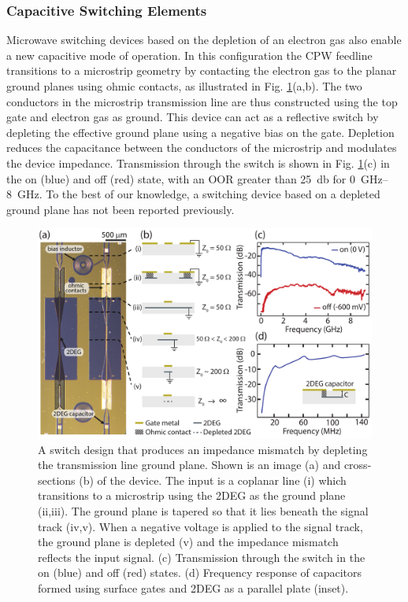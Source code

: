 \subsubsection{Capacitive Switching Elements}
Microwave switching devices based on the depletion of an electron gas also enable a new capacitive mode of operation. In this configuration the CPW feedline transitions to a microstrip geometry by contacting the electron gas to the planar ground planes using ohmic contacts, as illustrated in Fig. \ref{fig:CAPswitch}(a,b). The two conductors in the microstrip transmission line are thus constructed using the top gate and electron gas as ground. This device can act as a reflective switch by depleting the effective ground plane using a negative bias on the gate. Depletion reduces the capacitance between the conductors of the microstrip and modulates the device impedance.
Transmission through the switch is shown in Fig. \ref{fig:CAPswitch}(c) in the on (blue) and off (red) state, with an OOR greater than \SI{25}{\decibel} for \SIrange{0}{8}{\giga\hertz}. To the best of our knowledge, a switching device based on a depleted ground plane has not been reported previously.

\begin{figure}
\centering
\includegraphics[width=0.8\linewidth]{Fig3_arch}
\caption[Schematic of a rf impedance matching switch]{\label{fig:CAPswitch}A switch design that produces an impedance mismatch by depleting the transmission line ground plane. Shown is an image (a) and cross-sections (b) of the device. The input is a coplanar line (i) which transitions to a microstrip using the 2DEG as the ground plane (ii,iii). The ground plane is tapered so that it lies beneath the signal track (iv,v). When a negative voltage is applied to the signal track, the ground plane is depleted (v) and the impedance mismatch reflects the input signal. (c) Transmission through the switch in the on (blue) and off (red) states. (d) Frequency response of capacitors formed using surface gates and 2DEG as a parallel plate (inset).}
\end{figure}

